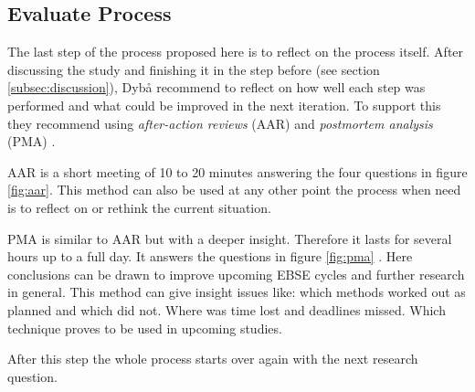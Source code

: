 
\subsection{Evaluate Process}
\label{subsec:evaluate process}

The last step of the process proposed here is to reflect on the process itself. After discussing the study and finishing it in the step before (see section \ref{subsec:discussion}), Dyb{\aa} \etal recommend to reflect on how well each step was performed and what could be improved in the next iteration. To support this they recommend using \emph{after-action reviews} (AAR) and \emph{postmortem analysis} (PMA) \cite{Dyba2005}.

AAR is a short meeting of 10 to 20 minutes answering the four questions in figure \ref{fig:aar}. This method can also be used at any other point the process when need is to reflect on or rethink the current situation\cite{Dyba2005}.

PMA is similar to AAR but with a deeper insight. Therefore it lasts for several hours up to a full day. It answers the questions in figure \ref{fig:pma} \cite{Dyba2005}. Here conclusions can be drawn to improve upcoming EBSE cycles and further research in general. This method can give insight issues like: which methods worked out as planned and which did not. Where was time lost and deadlines missed. Which technique proves to be used in upcoming studies. 

After this step the whole process starts over again with the next research question.

